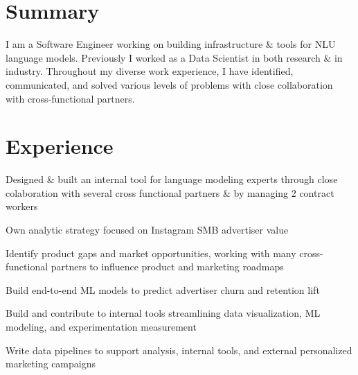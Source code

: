 \documentclass[]{deedy-resume-openfont}
\begin{document}
\hfill
\begin{minipage}[t]{0.63\textwidth}

\section{Summary}
I am a Software Engineer working on building infrastructure \& tools for NLU language models.
Previously I worked as a Data Scientist in both research \& in industry.
Throughout my diverse work experience, I have identified,
communicated, and solved various levels of problems with close collaboration with
cross-functional partners.
\sectionsep




\section{Experience}
\vspace{\topsep}
\begin{tightemize}
\item {Designed \& built an internal tool for language modeling experts through close colaboration with several cross functional partners \& by managing 2 contract workers}
\end{tightemize}
\sectionsep

\vspace{\topsep}
\begin{tightemize}
\item {Own analytic strategy focused on Instagram SMB advertiser value}
\item {Identify product gaps and market opportunities, working with many cross-functional
	partners to influence product and marketing roadmaps}
\item {Build end-to-end ML models to predict advertiser churn and retention lift}
\item {Build and contribute to internal tools streamlining data visualization, ML modeling, and experimentation measurement}
\item {Write data pipelines to support analysis, internal tools, and external personalized marketing campaigns}
\end{tightemize}
\sectionsep


\end{minipage}
\end{document}
